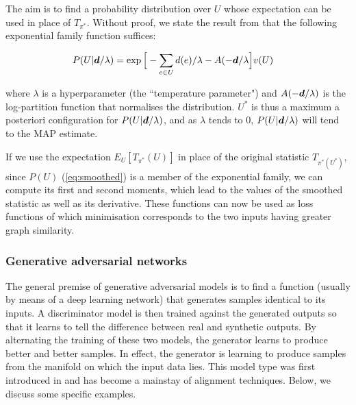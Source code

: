 The aim is to find a probability distribution over $U$ whose expectation can be used in place of $T_{\pi^*}$. Without proof, we state the result from \cite{torchtwosample} that the following exponential family function suffices:

\begin{equation}
\label{eq:smoothed}
\begin{split}
P(U | \boldsymbol{d} / \lambda) &= \exp\Big[-\sum_{e \in U} d(e) / \lambda - A(-\boldsymbol{d} / \lambda \Big] v(U)
\end{split}
\end{equation}

where $\lambda$ is a hyperparameter (the ``temperature parameter") and $A(-\boldsymbol{d} / \lambda)$ is the log-partition function  that normalises the distribution. $U^*$ is thus a maximum a posteriori configuration for $P(U | \boldsymbol{d}/\lambda)$, and as $\lambda$ tends to 0,  $P(U | \boldsymbol{d}/\lambda)$ will tend to the MAP estimate. 

If we use the expectation $E_{U}[T_{\pi^*}(U)]$ in place of the original statistic $T_{\pi^*(U^*)}$, since $P(U)$ (\ref{eq:smoothed}) is a member of the exponential family, we can compute its first and second moments, which lead to the values of the smoothed statistic as well as its derivative. These functions can now be used as loss functions of which minimisation corresponds to the two inputs having greater graph similarity. 


\subsubsection{Generative adversarial networks}

The general premise of generative adversarial models is to find a function (usually by means of a deep learning network) that generates samples identical to its inputs. A discriminator model is then trained against the generated outputs so that it learns to tell the difference between real and synthetic outputs. By alternating the training of these two models, the generator learns to produce better and better samples. In effect, the generator is learning to produce samples from the manifold on which the input data lies. This model type was first introduced in \cite{GAN} and has become a mainstay of alignment techniques. Below, we discuss some specific examples. 

